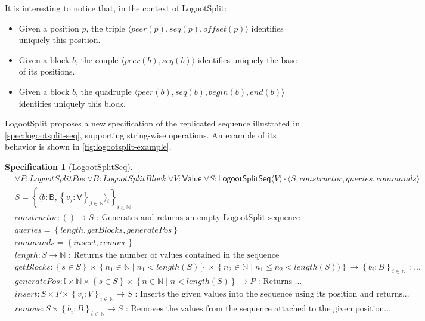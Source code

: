 \documentclass{article}
\newcommand{\commands}[1]{commands = \set{#1}}
\newcommand{\fnspec}[3]{#1: #2 \text{ : #3}}
\newcommand{\inbb}[1]{\in \mathbb{#1}}
\newcommand{\mathlist}[2]{\set{#1_i: #2}_{i \inbb{N}}}
\newcommand{\queries}[1]{queries = \set{#1}}
\newcommand{\set}[1]{\left\{#1\right\}} %
\newcommand{\spectuple}[1]{\tuple{#1, constructor, queries, commands}}
\newcommand{\ssep}{\mid} %
\newcommand{\tuple}[1]{\langle #1 \rangle}
\theoremstyle{definition}
\theoremstyle{definition}
\theoremstyle{definition}
\newcounter{specificationcounter}
\theoremstyle{definition}
\newtheorem{specification}[specificationcounter]{Specification}
\begin{document}
It is interesting to notice that, in the context of LogootSplit:
\begin{itemize}
    \item Given a position $p$, the triple $\tuple{peer(p), seq(p), offset(p)}$ identifies uniquely this position.
    \item Given a block $b$, the couple $\tuple{peer(b), seq(b)}$ identifies uniquely the base of its positions.
    \item Given a block $b$, the quadruple $\tuple{peer(b), seq(b), begin(b), end(b)}$ identifies uniquely this block.
\end{itemize}

LogootSplit proposes a new specification of the replicated sequence illustrated in \autoref{spec:logootsplit-seq}, supporting string-wise operations. An example of its behavior is shown in \autoref{fig:logootsplit-example}.

\begin{specification}[LogootSplitSeq]
    \begin{align*}
    &\forall P: LogootSplitPos \ \forall B: LogootSplitBlock \ \forall V: \mathsf{Value} \ \forall S: \mathsf{LogootSplitSeq} \tuple{V} \cdot \spectuple{S}\\
    &S = \set{\tuple{b: \mathsf{B}, \set{v_j: \mathsf{V}}_{j \inbb {N}}}_i}_{i \inbb{N}}\\
    &\fnspec{constructor}{\left( \right) \to S}{Generates and returns an empty LogootSplit sequence}\\
    &\queries{length, getBlocks, generatePos}\\
    &\commands{insert, remove}\\
    &\fnspec{length}{S \to \mathbb{N}}{Returns the number of values contained in the sequence}\\
    &\fnspec{getBlocks}{\set{s \in S} \times \set{n_1 \inbb{N} \ssep n_1 < length(S)} \times \set{n_2 \inbb{N} \ssep n_1 \leq n_2 < length(S))} \to \mathlist{b}{B}}{...}\\
    &\fnspec{generatePos}{\mathbb{I} \times \mathbb{N} \times \set{s \in S} \times \set{n \inbb{N} \ssep n < length(S)} \to P}{Returns ...}\\
    &\fnspec{insert}{S \times P \times \mathlist{v}{V} \to S}{Inserts the given values into the sequence using its position and returns...}\\
    &\fnspec{remove}{S \times \mathlist{b}{B} \to S}{Removes the values from the sequence attached to the given position...}
    \end{align*}
    \label{spec:logootsplit-seq}
\end{specification}
\end{document}

